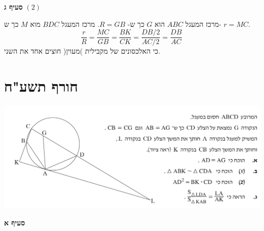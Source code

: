 \documentclass[12pt,a4paper]{article}
\begin{document}
\textbf{סעיף ג}
$(2)$

מרכז המעגל
$ABC$
הוא
$G$
כך ש-%
$R=GB$.
מרכז המעגל
$BDC$
מוא 
$M$
כך ש-%
$r=MC$.
\[
\frac{r}{R}=\frac{MC}{GB}=\frac{BK}{CK}=\frac{DB/2}{AC/2}=\frac{DB}{AC}\,
\]
כי האלכסונים של מקבילית )מעוין( חוצים אחד את השני.







\section*{חורף תשע"ח}

\begin{center}
\includegraphics[width=\textwidth]{winter-2018-4}
\end{center}
\vspace{-8mm}

\textbf{סעיף א}
\end{document}
